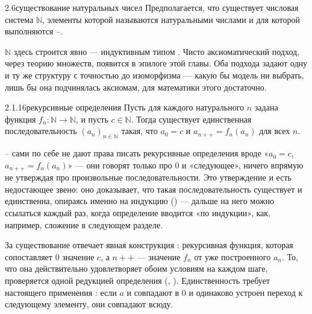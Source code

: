 \begin{assumption}{2.6}{существование натуральных чисел}
Предполагается, что существует числовая система $\mathbb{N}$, элементы которой называются
натуральными числами и для которой выполняются –.
\end{assumption}

\begin{remark}
$\mathbb{N}$ здесь строится явно — индуктивным типом . Чисто аксиоматический
подход, через теорию множеств, появится в эпилоге этой главы. Оба подхода задают одну и ту
же структуру с точностью до изоморфизма — какую бы модель ни выбрать, лишь бы она
подчинялась аксиомам, для математики этого достаточно.
\end{remark}

\begin{proposition}{2.1.16}{рекурсивные определения}
Пусть для каждого натурального $n$ задана функция $f_n : \mathbb{N} \to \mathbb{N}$, и пусть
$c \in \mathbb{N}$. Тогда существует единственная последовательность $(a_n)_{n \in \mathbb{N}}$
такая, что $a_0 = c$ и $a_{n{+}{+}} = f_n(a_n)$ для всех $n$.
\end{proposition}

\begin{intuition}
– сами по себе не дают права писать рекурсивные определения вроде «$a_0=c$,
$a_{n{+}{+}}=f_n(a_n)$» — они говорят только про $0$ и «следующее», ничего впрямую не
утверждая про произвольные последовательности. Это утверждение и есть недостающее звено: оно доказывает, что такая
последовательность существует и единственна, опираясь именно на индукцию () —
дальше на него можно ссылаться каждый раз, когда определение вводится «по индукции», как,
например, сложение в следующем разделе.
\end{intuition}

\begin{remark}
За существование отвечает явная конструкция : рекурсивная функция, которая
сопоставляет $0$ значение $c$, а $n{+}{+}$ — значение $f_n$ от уже построенного $a_n$. То, что
она действительно удовлетворяет обоим условиям на каждом шаге, проверяется одной редукцией
определения (, ). Единственность требует
настоящего применения : если $a$ и 
совпадают в $0$ и одинаково устроен переход к следующему элементу, они совпадают всюду.
\end{remark}

